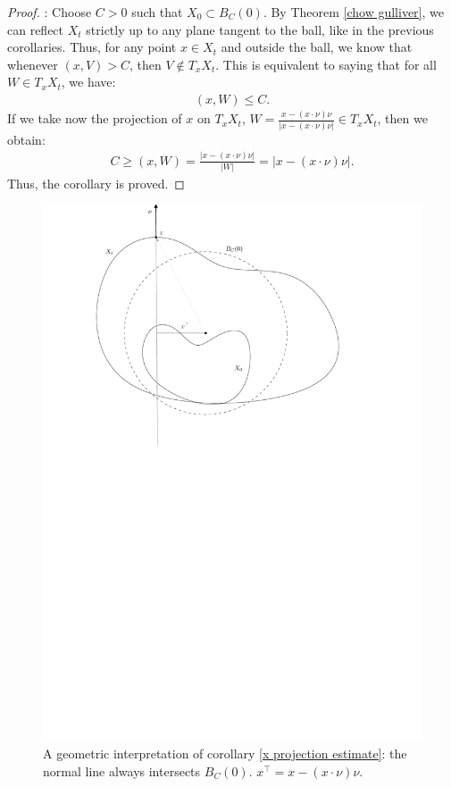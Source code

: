 \begin{proof}: 
	Choose $ C > 0 $ such that $ X_0 \subset B_C(0) $. By Theorem \ref{chow gulliver}, we can reflect $ X_t $ strictly up to any plane tangent to the ball, like in the previous corollaries.	
	Thus, for any point $ x \in X_t $ and outside the ball, we know that whenever $ (x, V) > C $, then $ V \notin T_x X_t $.
	This is equivalent to saying that for all $ W \in T_x X_t $, we have:
	\begin{align*}
		(x, W) \leq C.
	\end{align*}
	If we take now the projection of $x$ on $T_x X_t$, $ W = \frac{x - (x \cdot \nu) \nu}{|x - (x \cdot \nu) \nu|} \in T_x X_t $, then we obtain:
	\begin{align*}
		C \geq (x, W) = \frac{|x - (x \cdot \nu) \nu|}{|W|} = |x - (x \cdot \nu) \nu|.
	\end{align*}	
	Thus, the corollary is proved.
\end{proof}


\begin{figure}
	\centering
	\includegraphics[width=\textwidth]{"figures/10_geometric_idea"}
	\caption{A geometric interpretation of corollary \ref{x projection estimate}: the normal line always intersects $B_C(0)$. $x^\top = x - (x \cdot \nu) \nu$.}
\end{figure}


